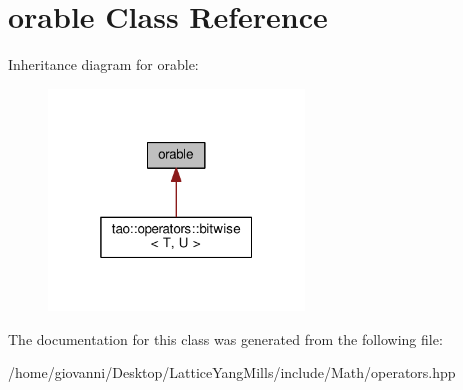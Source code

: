 \hypertarget{classorable}{}\section{orable Class Reference}
\label{classorable}


Inheritance diagram for orable\+:\nopagebreak
\begin{figure}[H]
\begin{center}
\leavevmode
\includegraphics[width=193pt]{classorable__inherit__graph}
\end{center}
\end{figure}


The documentation for this class was generated from the following file\+:\begin{DoxyCompactItemize}
\item 
/home/giovanni/\+Desktop/\+Lattice\+Yang\+Mills/include/\+Math/operators.\+hpp\end{DoxyCompactItemize}
